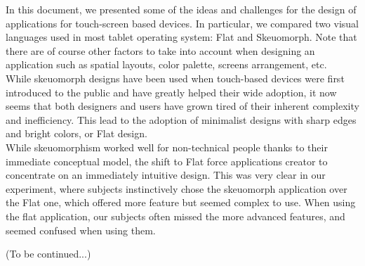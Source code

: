\documentclass[a4paper,11pt] {article}
\theoremstyle{definition}
\begin{document}
In this document, we presented some of the ideas and challenges for the design of applications for touch-screen based devices. In particular, we compared two visual languages used in most tablet operating system: Flat and Skeuomorph. Note that there are of course other factors to take into account when designing an application such as spatial layouts, color palette, screens arrangement, etc.\\

While skeuomorph designs have been used when touch-based devices were first introduced to the public and have greatly helped their wide adoption, it now seems that both designers and users have grown tired of their inherent complexity and inefficiency. This lead to the adoption of minimalist designs with sharp edges and bright colors, or Flat design.\\

While skeuomorphism worked well for non-technical people thanks to their immediate conceptual model, the shift to Flat force applications creator to concentrate on an immediately intuitive design. This was very clear in our experiment, where subjects instinctively chose the skeuomorph application over the Flat one, which offered more feature but seemed complex to use. When using the flat application, our subjects often missed the more advanced features, and seemed confused when using them.

(To be continued...)

\newpage
\appendix
\end{document}
